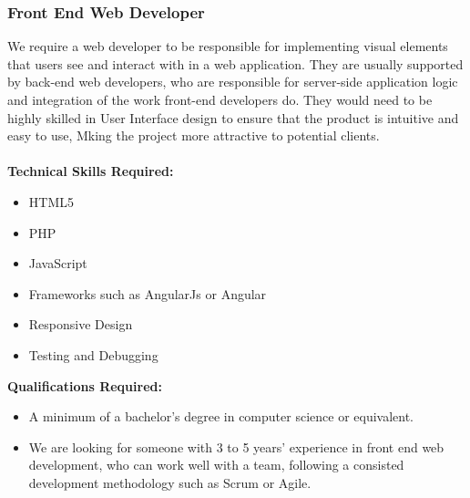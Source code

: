\documentclass[11pt, oneside, a4paper, titlepage]{article}
\begin{document}
\subsubsection{Front End Web Developer}
We require a web developer to be responsible for implementing visual elements that users see and interact with in a web application. They are usually supported by back-end web developers, who are responsible for server-side application logic and integration of the work front-end developers do. They would need to be highly skilled in User Interface design to ensure that the product is intuitive and easy to use, Mking the project more attractive to potential clients.  
\\
\\
\textbf{Technical Skills Required:}
\begin{itemize}
	\item HTML5
	\item PHP
	\item JavaScript
	\item Frameworks such as AngularJs or Angular
	\item Responsive Design
	\item Testing and Debugging
\end{itemize}
\hfill \break
\textbf{Qualifications Required:}
\begin{itemize}
	\item A minimum of a bachelor's degree in computer science or equivalent.
	\item We are looking for someone with 3 to 5 years' experience in front end web development, who can work well with a team, following a consisted development methodology such as Scrum or Agile.
\end{itemize}
\newpage
\end{document}
